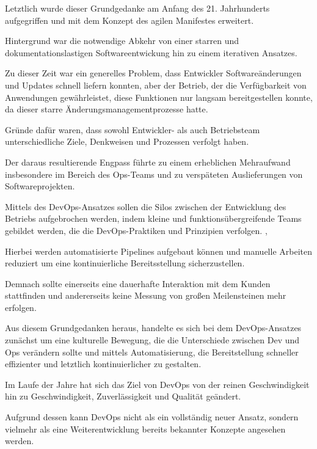 Letztlich wurde dieser Grundgedanke am Anfang des 21. Jahrhunderts aufgegriffen und mit dem Konzept des agilen Manifestes erweitert.

Hintergrund war die notwendige Abkehr von einer starren und dokumentationslastigen Softwareentwickung hin zu einem iterativen Ansatzes. \cite[S.4]{sharma_devops_2017}  

Zu dieser Zeit war ein generelles Problem, dass Entwickler Softwareänderungen und Updates schnell liefern konnten, aber der Betrieb, der die Verfügbarkeit von Anwendungen gewährleistet, diese Funktionen nur langsam bereitgestellen konnte, da dieser starre Änderungsmanagementprozesse hatte.

Gründe dafür waren, dass sowohl Entwickler- als auch Betriebsteam unterschiedliche Ziele, Denkweisen und Prozessen verfolgt haben. \cite{wettinger_streamlining_2016} 

Der daraus resultierende Engpass führte zu einem erheblichen Mehraufwand insbesondere im Bereich des Ops-Teams und zu verspäteten Auslieferungen von Softwareprojekten.

Mittels des DevOps-Ansatzes sollen die Silos zwischen der Entwicklung des Betriebs aufgebrochen werden, indem kleine und funktionsübergreifende Teams gebildet werden, die die DevOps-Praktiken und Prinzipien verfolgen. \cite{ebert_devops_2016}, \cite{wiedemann_research_2019}  

Hierbei werden automatisierte Pipelines aufgebaut können und manuelle Arbeiten reduziert um eine kontinuierliche Bereitsstellung sicherzustellen. \cite[S.3,5]{verona_practical_2016}

Demnach sollte einerseits eine dauerhafte Interaktion mit dem Kunden stattfinden und andererseits keine Messung von großen Meilensteinen mehr erfolgen. \cite[S.5]{sharma_devops_2017} 

Aus diesem Grundgedanken heraus, handelte es sich bei dem DevOps-Ansatzes zunächst um eine kulturelle Bewegung, die die Unterschiede zwischen Dev und Ops verändern sollte und mittels Automatisierung, die Bereitstellung schneller effizienter und letztlich kontinuierlicher zu gestalten. \cite[S.5]{sharma_devops_2017} 

Im Laufe der Jahre hat sich das Ziel von DevOps von der reinen Geschwindigkeit hin zu Geschwindigkeit, Zuverlässigkeit und Qualität geändert.\cite[S.xxix]{sharma_devops_2017}  

Aufgrund dessen kann DevOps nicht als ein vollständig neuer Ansatz, sondern vielmehr als eine Weiterentwicklung bereits bekannter Konzepte angesehen werden. \cite[S. 23]{alt_innovationsorientiertes_2017}

